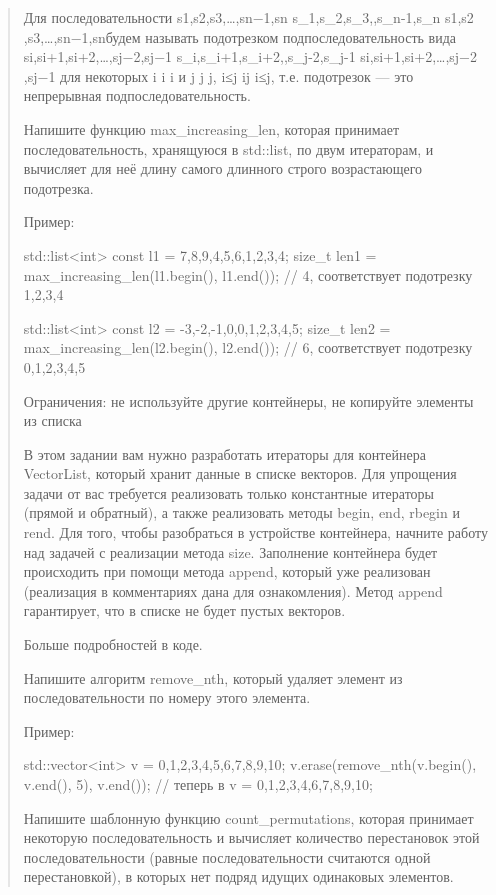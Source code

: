 \documentclass[]{article}
\begin{document}
\begin{quote}
Для последовательности s1,s2,s3,…,sn−1,sn s_1,s_2,s_3,\dotsc,s_{n-1},s_{n} s1​,s2​,s3​,…,sn−1​,sn​ будем называть подотрезком подпоследовательность вида si,si+1,si+2,…,sj−2,sj−1 s_i,s_{i+1},s_{i+2},\dotsc,s_{j-2},s_{j-1} si​,si+1​,si+2​,…,sj−2​,sj−1​ для некоторых i i i и j j j, i≤j i\le j i≤j, т.е. подотрезок — это непрерывная подпоследовательность.

Напишите функцию max_increasing_len, которая принимает последовательность, хранящуюся в std::list, по двум итераторам, и вычисляет для неё длину самого длинного строго возрастающего подотрезка.

Пример:

std::list<int> const l1 = {7,8,9,4,5,6,1,2,3,4};
size_t len1 = max_increasing_len(l1.begin(), l1.end()); // 4, соответствует подотрезку 1,2,3,4

std::list<int> const l2 = {-3,-2,-1,0,0,1,2,3,4,5};
size_t len2 = max_increasing_len(l2.begin(), l2.end()); // 6, соответствует подотрезку 0,1,2,3,4,5


Ограничения: не используйте другие контейнеры, не копируйте элементы из списка



В этом задании вам нужно разработать итераторы для контейнера VectorList, который хранит данные в списке векторов. Для упрощения задачи от вас требуется реализовать только константные итераторы (прямой и обратный), а также реализовать методы begin, end, rbegin и rend. Для того, чтобы разобраться в устройстве контейнера, начните работу над задачей с реализации метода size. Заполнение контейнера будет происходить при помощи метода append, который уже реализован (реализация в комментариях дана для ознакомления). Метод append гарантирует, что в списке не будет пустых векторов.

Больше подробностей в коде.



Напишите алгоритм remove_nth, который удаляет элемент из последовательности по номеру этого элемента.

Пример:

std::vector<int> v = {0,1,2,3,4,5,6,7,8,9,10};
v.erase(remove_nth(v.begin(), v.end(), 5), v.end());
// теперь в v = {0,1,2,3,4,6,7,8,9,10};



Напишите шаблонную функцию count_permutations, которая принимает некоторую последовательность и вычисляет количество перестановок этой последовательности (равные последовательности считаются одной перестановкой), в которых нет подряд идущих одинаковых элементов.


\end{quote}
\end{document}
